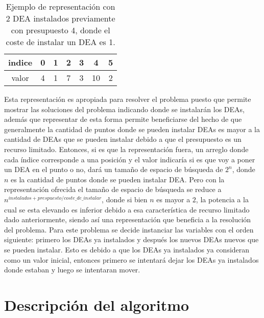 \documentclass[letter, 10pt]{article}
\begin{document}
\begin{table}[h!]
    \centering
    \begin{tabular}{|c|c|c|c|c|c|c|}
    \hline
    indice & 0 & 1 & 2 & 3 & 4 & 5\\
    \hline
    valor & 4 & 1 & 7 & 3 & 10 & 2\\
    \hline
    \end{tabular}
    \caption{Ejemplo de representaci\'on con 2 DEA instalados previamente con presupuesto 4, donde el coste de instalar un DEA es 1.}
    \label{tab:ejemplo2}
\end{table}

Esta representaci\'on es apropiada para resolver el problema puesto que permite mostrar las soluciones del problema indicando donde se instalar\'an los DEAs, adem\'as que representar de esta forma permite beneficiarse del hecho de que generalmente la cantidad de puntos donde se pueden instalar DEAs es mayor a la cantidad de DEAs que se pueden instalar debido a que el presupuesto es un recurso limitado. Entonces, si es que la representaci\'on fuera, un arreglo donde cada \'indice corresponde a una posici\'on y el valor indicar\'ia si es que voy a poner un DEA en el punto o no, dar\'a un tama\~no de espacio de b\'usqueda de $2^{n}$, donde $n$ es la cantidad de puntos donde se pueden instalar DEA. Pero con la representaci\'on ofrecida el tama\~no de espacio de b\'usqueda se reduce a $n^{instalados + prespuesto / coste\_de\_instalar}$, donde si bien $n$ es mayor a $2$, la potencia a la cual se esta elevando es inferior debido a esa caracter\'istica de recurso limitado dado anteriormente, siendo as\'i una representaci\'on que beneficia a la resoluci\'on del problema. Para este problema se decide instanciar las variables con el orden siguiente: primero los DEAs ya instalados y despu\'es los nuevos DEAs nuevos que se pueden instalar. Esto es debido a que los DEAs ya instalados ya consideran como un valor inicial, entonces primero se intentar\'a dejar los DEAs ya instalados donde estaban y luego se intentaran mover.

\section{Descripci\'on del algoritmo}
\end{document}
